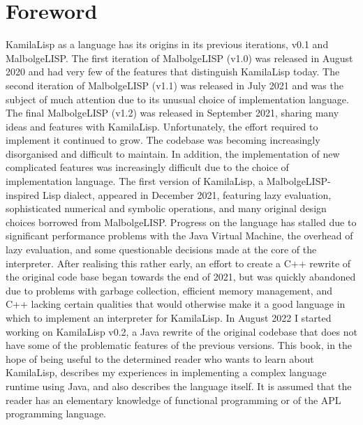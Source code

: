 
\chapter*{Foreword}
\par KamilaLisp as a language has its origins in its previous iterations, v0.1 and MalbolgeLISP. The first iteration of MalbolgeLISP (v1.0) was released in August 2020 and had very few of the features that distinguish KamilaLisp today. The second iteration of MalbolgeLISP (v1.1) was released in July 2021 and was the subject of much attention due to its unusual choice of implementation language. The final MalbolgeLISP (v1.2) was released in September 2021, sharing many ideas and features with KamilaLisp. Unfortunately, the effort required to implement it continued to grow. The codebase was becoming increasingly disorganised and difficult to maintain. In addition, the implementation of new complicated features was increasingly difficult due to the choice of implementation language. The first version of KamilaLisp, a MalbolgeLISP-inspired Lisp dialect, appeared in December 2021, featuring lazy evaluation, sophisticated numerical and symbolic operations, and many original design choices borrowed from MalbolgeLISP. Progress on the language has stalled due to significant performance problems with the Java Virtual Machine, the overhead of lazy evaluation, and some questionable decisions made at the core of the interpreter. After realising this rather early, an effort to create a C++ rewrite of the original code base began towards the end of 2021, but was quickly abandoned due to problems with garbage collection, efficient memory management, and C++ lacking certain qualities that would otherwise make it a good language in which to implement an interpreter for KamilaLisp. In August 2022 I started working on KamilaLisp v0.2, a Java rewrite of the original codebase that does not have some of the problematic features of the previous versions. This book, in the hope of being useful to the determined reader who wants to learn about KamilaLisp, describes my experiences in implementing a complex language runtime using Java, and also describes the language itself. It is assumed that the reader has an elementary knowledge of functional programming or of the APL programming language.

